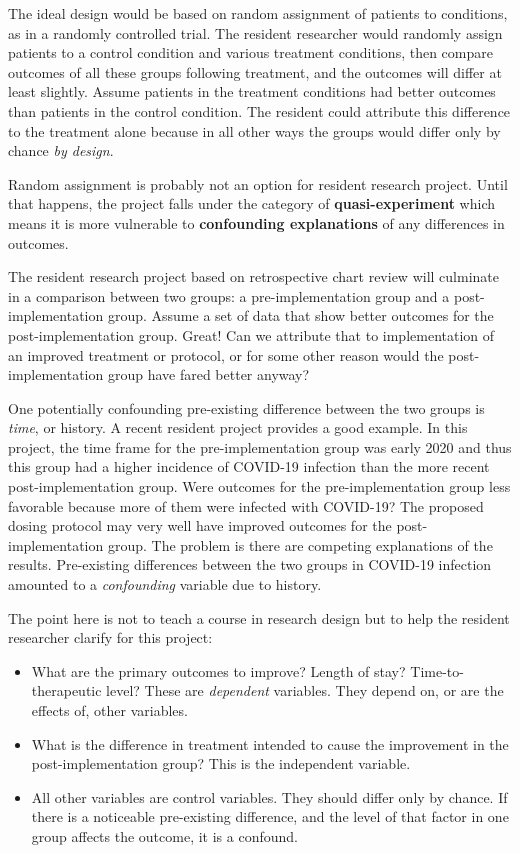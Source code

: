 \documentclass[
]{report}
\providecommand{\tightlist}{%
  \setlength{\itemsep}{0pt}\setlength{\parskip}{0pt}}
\begin{document}
The ideal design would be based on random assignment of patients to
conditions, as in a randomly controlled trial. The resident researcher
would randomly assign patients to a control condition and various
treatment conditions, then compare outcomes of all these groups
following treatment, and the outcomes will differ at least slightly.
Assume patients in the treatment conditions had better outcomes than
patients in the control condition. The resident could attribute this
difference to the treatment alone because in all other ways the groups
would differ only by chance \emph{by design}.

Random assignment is probably not an option for resident research
project. Until that happens, the project falls under the category of
\textbf{quasi-experiment} which means it is more vulnerable to
\textbf{confounding explanations} of any differences in outcomes.

The resident research project based on retrospective chart review will
culminate in a comparison between two groups: a pre-implementation group
and a post-implementation group. Assume a set of data that show better
outcomes for the post-implementation group. Great! Can we attribute that
to implementation of an improved treatment or protocol, or for some
other reason would the post-implementation group have fared better
anyway?

One potentially confounding pre-existing difference between the two
groups is \emph{time}, or history. A recent resident project provides a
good example. In this project, the time frame for the pre-implementation
group was early 2020 and thus this group had a higher incidence of
COVID-19 infection than the more recent post-implementation group. Were
outcomes for the pre-implementation group less favorable because more of
them were infected with COVID-19? The proposed dosing protocol may very
well have improved outcomes for the post-implementation group. The
problem is there are competing explanations of the results. Pre-existing
differences between the two groups in COVID-19 infection amounted to a
\emph{confounding} variable due to history.

The point here is not to teach a course in research design but to help
the resident researcher clarify for this project:

\begin{itemize}
\tightlist
\item
  What are the primary outcomes to improve? Length of stay?
  Time-to-therapeutic level? These are \emph{dependent} variables. They
  depend on, or are the effects of, other variables.
\item
  What is the difference in treatment intended to cause the improvement
  in the post-implementation group? This is the independent variable.
\item
  All other variables are control variables. They should differ only by
  chance. If there is a noticeable pre-existing difference, and the
  level of that factor in one group affects the outcome, it is a
  confound.
\end{itemize}
\end{document}
